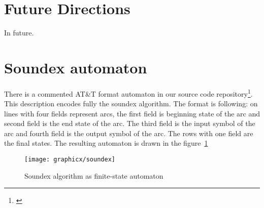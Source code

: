 \documentclass[a4paper,12pt]{article}
\begin{document}
\section{Future Directions}
\label{sec:future}

In future.



\section*{Soundex automaton}
\label{appendix:soundex}

There is a commented AT\&T format automaton in our source code
repository\footnote{\url{}}. This description encodes fully the soundex
algorithm.  The format is following: on lines with four fields represent arcs,
the first field is beginning state of the arc and second field is the end state
of the arc. The third field is the input symbol of the arc and fourth field is
the output symbol of the arc. The rows with one field are the final states. The
resulting automaton is drawn in the figure~\ref{fig:soundex}

\begin{figure}
    \centering
    \texttt{[image: graphicx/soundex]}
    \caption{Soundex algorithm as finite-state automaton
    \label{fig:soundex}}
\end{figure}
\end{document}
